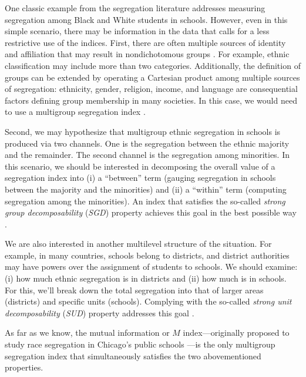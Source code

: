 One classic example from the segregation literature addresses measuring segregation among Black and White students in schools. However, even in this simple scenario, there may be information in the data that calls for a less restrictive use of the indices.
First, there are often multiple sources of identity and affiliation that may result in nondichotomous groups \citep{akerlof_kranton_2010}. For example, ethnic classification may include more than two categories. Additionally, the definition of groups can be extended by operating a Cartesian product among multiple sources of segregation: ethnicity, gender, religion, income, and language are consequential factors defining group membership in many societies. In this case, we would need to use a multigroup segregation index \citep{reardon2002measures}.

Second, we may hypothesize that multigroup ethnic segregation in schools is produced via two channels. One is the segregation between the ethnic majority and the remainder. The second channel is the segregation among minorities. In this scenario, we should be interested in decomposing the overall value of a segregation index into (i) a ``between'' term (gauging segregation in schools between the majority and the minorities) and (ii) a ``within'' term (computing segregation among the minorities). An index that satisfies the so-called \textit{strong group decomposability} (\textit{SGD}) property achieves this goal in the best possible way \citep{frankel_volij_2011}.

We are also interested in another multilevel structure of the situation. For example, in many countries, schools belong to districts, and district authorities may have powers over the assignment of students to schools. We should examine: (i) how much ethnic segregation is in districts and (ii) how much is in schools. For this, we'll break down the total segregation into that of larger areas (districts) and specific units (schools). Complying with the so-called \textit{strong unit decomposability} (\textit{SUD}) property addresses this goal \citep{frankel_volij_2011}.

As far as we know, the mutual information or $M$ index---originally proposed to study race segregation in Chicago's public schools \citep{theil_finizza_1971}---is the only multigroup segregation index that simultaneously satisfies the two abovementioned properties.


